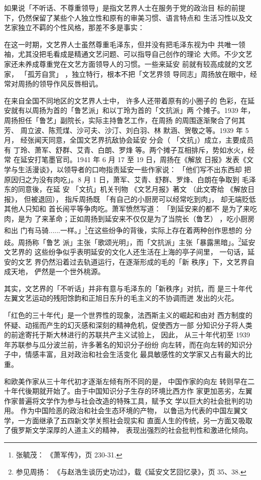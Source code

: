 如果说「不听话、不尊重领导」是指文艺界人士在服务于党的政治目
标的前提下，仍然保留了某些个人独立性和原有的审美习惯、语言特点和
生活习性以及文艺家独立不羁的个性风格，那差不多是事实：

在这一时期，文艺界人士虽然尊重毛泽东，但并没有把毛泽东视为中
共唯一领袖，尤其没把毛看成是精通文艺问题、可以指导自己创作的理论
大师。不少文艺家还未养成尊重党在文艺方面领导人的习惯。一些来延安
前就有较高成就的文艺家，
「孤芳自赏」
，独立特行，根本不把「文艺界领
导同志」周扬放在眼中，经常对周扬的领导作风反唇相讥。

在来自全国不同地区的文艺界人士中， 许多人还带着原有的小圈子的 色彩，在延
安就有以周扬为首的「鲁艺派」和以丁玲为首的「文抗派」两 个摊子。1939 年，
周扬担任「鲁艺」副院长，实际主持鲁艺工作，在周扬 的周围逐渐聚合了何其芳、
周立波、陈荒煤、沙可夫、沙汀、刘白羽、林 默涵、贺敬之等。1939 年 5 月，
经张闻天同意，全国文艺界抗敌协会延安 分会（ 「文抗」）成立，主要成员有
丁玲、萧军、舒群、艾青、白朗、罗烽 等。两个摊子互相排斥，势如水火，经常
在延安打笔墨官司。1941 年 6 月 17 至 19 日，周扬在《解放
日报》发表《文学与生活漫谈》，以领导者的口吻指责延安一些作家说： 「他们写不出东西却
把原因归之为没有肉吃」。8 月 1 日，萧军、艾青、舒群、罗烽、白朗在争取到
毛泽东的同意後，在延 安 「文抗」机关刊物 《文艺月报》著文 （此文寄给
《解放日报》， 但被退回）， 指斥周扬既 「有自己的小厨房可以经常吃到肉」，
却无端贬低其他人只知和 首长闹平等争肉吃。萧军愤然写道： 「到延安来的都不
是为了来吃肉，是为 了来革命；正如周扬到延安来不仅仅是为了当院长（鲁艺）
，吃小厨房和出 门有马骑......一样。」\footnote{张毓茂： 《萧军传》，页
230-31.}在这些纷争的背後，实际上存在着两种创作思想的 分歧。周扬称「鲁艺
派」主张「歌颂光明」，而「文抗派」主张「暴露黑暗」。\footnote{参见周扬：
《与赵浩生谈历史功过》，载《延安文艺回忆录》，页 35、38.}延安文艺界的
这些纷争似乎表明延安的文化人还生活在上海的亭子间里， 一句话，延安的文艺
界仍然沿着过去轨道运行，在逐渐形成的毛的「新 秩序」下，文艺界自成天地，
俨然是一个世外桃源。

其实，文艺界的「不听话」并非有意与毛泽东的「新秩序」对抗，而
是三十年代左翼文艺运动的残阳馀韵和正旭日东升的毛主义的不协调而迸
发出的火花。

「红色的三十年代」是一个世界性的现象，法西斯主义的崛起和由对
西方制度的怀疑、动摇而产生的幻灭感和深刻的精神危机，促使西方一部
分知识分子将人类的前途寄托于斯大林进行的苏联共产主义试验上，
因此，
从三十年代初至 1939 年苏联参与瓜分波兰前，许多著名的知识分子纷纷
向左转，而在向左转的知识分子中，情感丰富，且对政治和社会生活变化
最具敏感性的文学家又占有最大的比重。

和欧美作家从三十年代初才逐渐左倾有所不同的是，
中国作家的向左
转则早在二十年代後期就开始了。由于中国知识分子生存的环境比西方作
家更加恶劣，左翼作家普遍将文学作为参与社会改造的特殊工具，赋予文
学以巨大的社会批判的功用。
作为中国险恶的政治和社会生态环境的产物，
以鲁迅为代表的中国左翼文学，一方面继承了五四新文学关照社会现实和
直面人生的传统，另一方面又吸取了俄罗斯文学深厚的人道主义的精神，
表现出强烈的社会批判性和激进化倾向。

